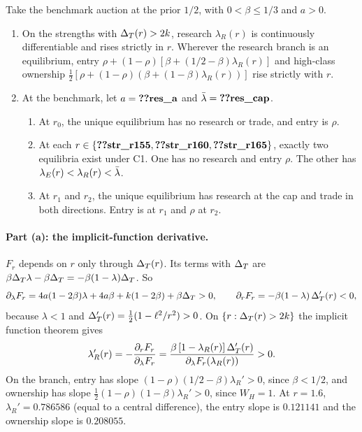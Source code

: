 \begin{resultbox}
Take the benchmark auction at the prior \(1/2\), with \(0<\beta\le1/3\) and \(a>0\).
\begin{enumerate}[label=(\alph*),leftmargin=2em]
\item On the strengths with \(\Delta_T(r)>2k\), research \(\lambda_R(r)\) is continuously differentiable and rises strictly in
\(r\). Wherever the research branch is an equilibrium, entry \(\rho+(1-\rho)[\beta+(1/2-\beta)\lambda_R(r)]\) and high-class
ownership \(\tfrac12[\rho+(1-\rho)(\beta+(1-\beta)\lambda_R(r))]\) rise strictly with \(r\).
\item At the benchmark, let \(a=\reg{res_a}\) and \(\lb=\reg{res_cap}\).
\begin{enumerate}[label=(\roman*),leftmargin=2em]
\item At \(r_0\), the unique equilibrium has no research or trade, and entry is \(\rho\).
\item At each \(r\in\{\reg{str_r155},\reg{str_r160},\reg{str_r165}\}\), exactly two equilibria exist under C1.
One has no research and entry \(\rho\).
The other has \(\lambda_E(r)<\lambda_R(r)<\bar\lambda\).
\item At \(r_1\) and \(r_2\), the unique equilibrium has research at the cap and trade in both directions.
Entry is  at \(r_1\) and \(\rho\) at \(r_2\).
\end{enumerate}
\end{enumerate}
\end{resultbox}

\paragraph{Part (a): the implicit-function derivative.} \(F_r\) depends on \(r\) only through \(\Delta_T(r)\). Its terms with
\(\Delta_T\) are \(\beta\Delta_T\lambda-\beta\Delta_T=-\beta(1-\lambda)\Delta_T\). So
\[
\partial_\lambda F_r=4a(1-2\beta)\lambda+4a\beta+k(1-2\beta)+\beta\Delta_T>0,\qquad
\partial_rF_r=-\beta(1-\lambda)\,\Delta_T'(r)<0,
\]
because \(\lambda<1\) and \(\Delta_T'(r)=\tfrac12(1-\ell^2/r^2)>0\). On \(\{r:\Delta_T(r)>2k\}\) the implicit function theorem gives
\[
\lambda_R'(r)=-\frac{\partial_rF_r}{\partial_\lambda F_r}=\frac{\beta\,[1-\lambda_R(r)]\,\Delta_T'(r)}{\partial_\lambda F_r(\lambda_R(r))}>0 .
\]
On the branch, entry has slope \((1-\rho)(1/2-\beta)\lambda_R'>0\), since \(\beta<1/2\), and ownership has slope
\(\tfrac12(1-\rho)(1-\beta)\lambda_R'>0\), since \(W_H=1\). At \(r=1.6\), \(\lambda_R'=0.786586\) (equal to a central
difference), the entry slope is \(0.121141\) and the ownership slope is \(0.208055\). %

